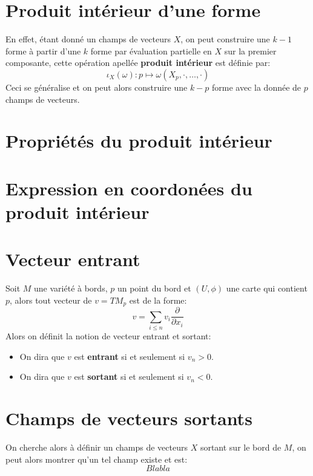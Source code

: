    \section{Produit intérieur d'une forme}
         En effet, étant donné un champs de vecteurs \( X \), on peut construire une \( k-1 \) forme à partir d'une \( k \) forme par évaluation partielle en \( X \) sur la premier composante, cette opération apellée \textbf{produit intérieur} est définie par:
         \[ 
            \iota_X(\omega) : p \mapsto \omega(X_p, \cdot, \ldots, \cdot)
         \]
         Ceci se généralise et on peut alors construire une \( k-p \) forme avec la donnée de \( p \) champs de vecteurs.
   \section{Propriétés du produit intérieur}
   \section{Expression en coordonées du produit intérieur}

   \section{Vecteur entrant}
      Soit $M$ une variété à bords, $p$ un point du bord et $(U, \phi)$ une carte qui contient $p$, alors tout vecteur de $v = TM_p$ est de la forme:
      \[ 
         v = \sum_{i \leq n} v_i \frac{\partial}{\partial x_i}
      \]
      Alors on définit la notion de vecteur entrant et sortant:
      \begin{itemize}
         \item On dira que $v$ est \textbf{entrant} si et seulement si $v_n > 0$.
         \item On dira que $v$ est \textbf{sortant} si et seulement si $v_n < 0$. 
      \end{itemize}
   \section{Champs de vecteurs sortants}
      On cherche alors à définir un champs de vecteurs \( X \) sortant sur le bord de \( M \), on peut alors montrer qu'un tel champ existe et est:
      \[ 
         Blabla 
      \]
   
   \pagebreak

